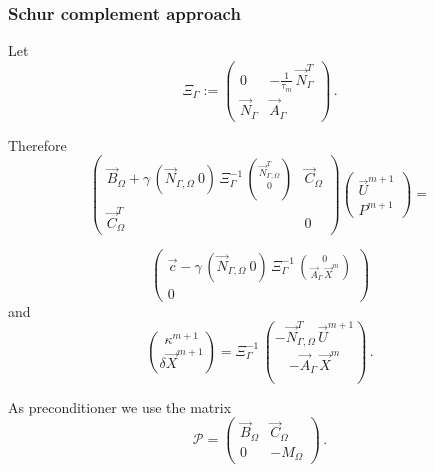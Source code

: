 \documentclass{beamer}
\newcommand{\NbulkT}{\vec{N}_{\Gamma,\Omega}^T}
\newcommand{\Nbulk}{\vec{N}_{\Gamma,\Omega}}
\begin{document}
\begin{frame}
\frametitle{Schur complement approach}

Let
\begin{equation*}
\Xi_\Gamma:= \begin{pmatrix}
 0 & - \frac1{\tau_m}\,\vec{N}_\Gamma^T \\
\vec{N}_\Gamma & \vec{A}_\Gamma
\end{pmatrix} \,.
\end{equation*}

Therefore
\begin{equation*}
\begin{pmatrix}
\vec B_\Omega + \gamma\,(\Nbulk \ 0)\,\Xi_\Gamma^{-1}\,
\binom{\NbulkT}{0} & \vec C_\Omega \\
\vec C_\Omega^T & 0
\end{pmatrix}
\begin{pmatrix}
\vec U^{m+1} \\ P^{m+1}
\end{pmatrix}
=
\end{equation*}

\begin{equation*}
\begin{pmatrix}
\vec c
-\gamma\,(\Nbulk \ 0)\, \Xi_\Gamma^{-1}\,
\binom{0}{\vec{A}_\Gamma\,\vec X^m} \\
0
\end{pmatrix}
\end{equation*}
and
\begin{equation*}
\binom{\kappa^{m+1}}{\delta\vec{X}^{m+1}} = \Xi_\Gamma^{-1}\,
\binom{-\NbulkT\,\vec U^{m+1}}{-\vec{A}_\Gamma\,\vec X^m}\,.
\end{equation*}

\pause

As preconditioner we use the matrix
\begin{equation*}
\mathcal{P} =
\begin{pmatrix}
\vec B_\Omega & \vec C_\Omega \\
0 & -M_\Omega
\end{pmatrix}
\,.
\end{equation*}
\end{frame}
\end{document}
